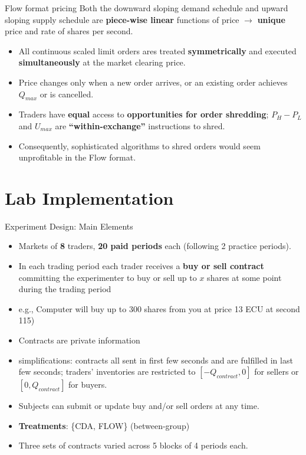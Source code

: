 \documentclass[10pt]{beamer}
\begin{document}
\begin{frame}{Flow format pricing}
Both the downward sloping demand schedule and upward sloping supply schedule are \textbf{piece-wise linear} functions of price $\rightarrow$ \textbf{unique} price and rate of shares per second. \pause
\begin{itemize}
\item All continuous scaled limit orders ares treated \textbf{symmetrically} and executed \textbf{simultaneously} at the market clearing price. \pause
\item Price changes only when a new order arrives, or an existing order achieves $Q_{max}$ or is cancelled.
\item Traders have \textbf{equal} access to \textbf{opportunities for order shredding}; $P_H - P_L$ and $U_{max}$ are  \textbf{``within-exchange''}
instructions to shred. \pause
\item Consequently, sophisticated algorithms to shred orders would seem unprofitable in the Flow format.
    \end{itemize} %
\end{frame}

\section{Lab Implementation}

\begin{frame}{Experiment Design: Main Elements}
    \begin{itemize}
        \item Markets of \textbf{8} traders, \textbf{20 paid periods} each (following 2 practice periods). \pause
        \item In each trading period each trader receives a \textbf{buy or sell contract} committing the experimenter to buy or sell up to $x$ shares at some point during the trading period 
        \item e.g., Computer will buy up to 300 shares from you at price 13 ECU at second 115) 
        \item Contracts are private information \pause
        \item simplifications: contracts all sent in first few seconds and are fulfilled in last few seconds; traders' inventories are restricted to $[-Q_{contract}, 0]$ for sellers or $[0, Q_{contract}]$ for buyers.
        \item Subjects can submit or update buy and/or sell orders at any time. \pause
        \item \textbf{Treatments}: \{CDA, FLOW\} (between-group)
        \item Three sets of contracts varied across 5 blocks of 4 periods each. 
    \end{itemize}
\end{frame}
\end{document}

